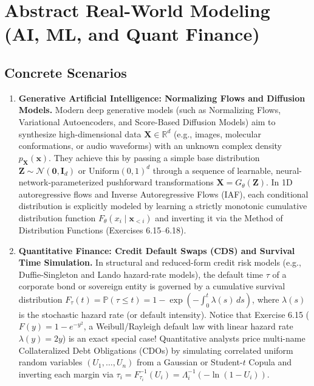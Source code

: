 \documentclass[11pt, letterpaper]{article}
\theoremstyle{definition}
\theoremstyle{remark}
\newcommand{\R}{\mathbb{R}}
\newcommand{\Prob}{\mathbb{P}}
\begin{document}
\newpage
\section{Abstract Real-World Modeling (AI, ML, and Quant Finance)}

\subsection{Concrete Scenarios}

\begin{enumerate}
    \item \textbf{Generative Artificial Intelligence: Normalizing Flows and Diffusion Models.}
    Modern deep generative models (such as Normalizing Flows, Variational Autoencoders, and Score-Based Diffusion Models) aim to synthesize high-dimensional data $\mathbf{X} \in \R^d$ (e.g., images, molecular conformations, or audio waveforms) with an unknown complex density $p_{\mathbf{X}}(\mathbf{x})$. They achieve this by passing a simple base distribution $\mathbf{Z} \sim \mathcal{N}(\mathbf{0}, \mathbf{I}_d)$ or $\text{Uniform}(0,1)^d$ through a sequence of learnable, neural-network-parameterized pushforward transformations $\mathbf{X} = G_\theta(\mathbf{Z})$. In 1D autoregressive flows and Inverse Autoregressive Flows (IAF), each conditional distribution is explicitly modeled by learning a strictly monotonic cumulative distribution function $F_\theta(x_i \mid \mathbf{x}_{<i})$ and inverting it via the Method of Distribution Functions (Exercises 6.15--6.18).

    \item \textbf{Quantitative Finance: Credit Default Swaps (CDS) and Survival Time Simulation.}
    In structural and reduced-form credit risk models (e.g., Duffie-Singleton and Lando hazard-rate models), the default time $\tau$ of a corporate bond or sovereign entity is governed by a cumulative survival distribution $F_\tau(t) = \Prob(\tau \le t) = 1 - \exp\left(-\int_0^t \lambda(s)\,ds\right)$, where $\lambda(s)$ is the stochastic hazard rate (or default intensity). Notice that Exercise 6.15 ($F(y) = 1 - e^{-y^2}$, a Weibull/Rayleigh default law with linear hazard rate $\lambda(y) = 2y$) is an exact special case! Quantitative analysts price multi-name Collateralized Debt Obligations (CDOs) by simulating correlated uniform random variables $(U_1, \dots, U_n)$ from a Gaussian or Student-$t$ Copula and inverting each margin via $\tau_i = F_{\tau_i}^{-1}(U_i) = \Lambda_i^{-1}(-\ln(1 - U_i))$.


\end{enumerate}
\end{document}

